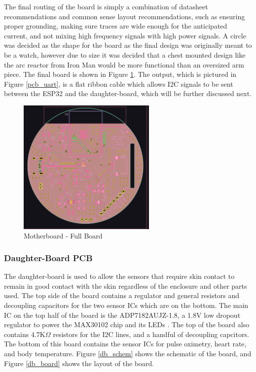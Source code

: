 \documentclass[12pt]{article}
\begin{document}
    The final routing of the board is simply a combination of datasheet recommendations and common sense layout recommendations, such as ensuring proper grounding, making sure traces are wide enough for the anticipated current, and not mixing high frequency signals with high power signals. A circle was decided as the shape for the board as the final design was originally meant to be a watch, however due to size it was decided that a chest mounted design like the arc reactor from Iron Man would be more functional than an oversized arm piece. The final board is shown in Figure \ref{pcb_board}. The output, which is pictured in Figure \ref{pcb_uart}, is a flat ribbon cable which allows I2C signals to be sent between the ESP32 and the daughter-board, which will be further discussed next.

    \begin{figure}[hbt!]
        \centering
        \includegraphics[width=0.6\textwidth]{images/pcb_board.png}
        \caption{Motherboard - Full Board}
        \label{pcb_board}
    \end{figure}

    \subsubsection{Daughter-Board PCB}
    The daughter-board is used to allow the sensors that require skin contact to remain in good contact with the skin regardless of the enclosure and other parts used. The top side of the board contains a regulator and general resistors and decoupling capacitors for the two sensor ICs which are on the bottom. The main IC on the top half of the board is the ADP7182AUJZ-1.8, a 1.8V low dropout regulator to power the MAX30102 chip and its LEDs \cite{1v8}. The top of the board also contains 4.7K$\Omega$ resistors for the I2C lines, and a handful of decoupling capcitors. The bottom of this board contains the sensor ICs for pulse oximetry, heart rate, and body temperature. Figure \ref{db_schem} shows the schematic of the board, and Figure \ref{db_board} shows the layout of the board.
    
\end{document}
